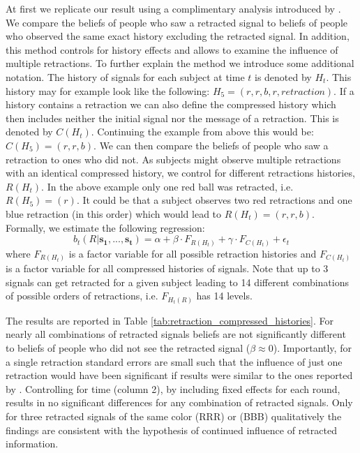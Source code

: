 \documentclass{article}
\begin{document}
At first we replicate our result using a complimentary analysis introduced by \cite{Goncalves2022}. We compare the beliefs of people who saw a retracted signal to beliefs of people who observed the same exact history excluding the retracted signal. In addition, this method controls for history effects and allows to examine the influence of multiple retractions. To further explain the method we introduce some additional notation. The history of signals for each subject at time $t$ is denoted by $H_t$. This history may for example look like the following: $H_5=(r,r,b,r,retraction)$. If a history contains a retraction we can also define the compressed history which then includes neither the initial signal nor the message of a retraction. This is denoted by $C(H_t)$. Continuing the example from above this would be: $C(H_5)=(r,r,b)$. We can then compare the beliefs of people who saw a retraction to ones who did not. As subjects might observe multiple retractions with an identical compressed history, we control for different retractions histories, $R(H_t)$. In the above example only one red ball was retracted, i.e. $R(H_5)=(r)$. It could be that a subject observes two red retractions and one blue retraction (in this order) which would lead to $R(H_t)=(r,r,b)$. Formally, we estimate the following regression: 
\begin{equation}
    b_t(R|\mathbf{s_1},...,\mathbf{s_t})=\alpha + \beta \cdot F_{R(H_t)} + \gamma \cdot F_{C(H_t)} + \epsilon_t
\end{equation}
where $F_{R(H_t)}$ is a factor variable for all possible retraction histories and $F_{C(H_t)}$ is a factor variable for all compressed histories of signals. Note that up to 3 signals can get retracted for a given subject leading to 14 different combinations of possible orders of retractions, i.e. $F_{H_t(R)}$ has 14 levels.

The results are reported in Table \ref{tab:retraction_compressed_histories}. For nearly all combinations of retracted signals beliefs are not significantly different to beliefs of people who did not see the retracted signal ($\beta\approx0$). Importantly, for a single retraction standard errors are small such that the influence of just one retraction would have been significant if results were similar to the ones reported by \cite{Goncalves2022}. Controlling for time (column 2), by including fixed effects for each round, results in no significant differences for any combination of retracted signals. Only for three retracted signals of the same color (RRR) or (BBB) qualitatively the findings are consistent with the hypothesis of continued influence of retracted information. 
\end{document}
